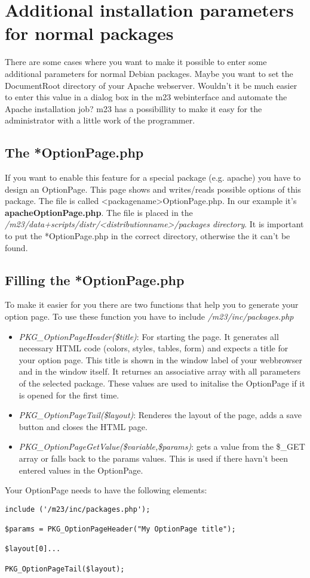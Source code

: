 \section{Additional installation parameters for normal packages}
There are some cases where you want to make it possible to enter some additional parameters for normal Debian packages. Maybe you want to set the DocumentRoot directory of your Apache webserver. Wouldn't it be much easier to enter this value in a dialog box in the m23 webinterface and automate the Apache installation job? m23 has a possibillity to make it easy for the administrator with a little work of the programmer.

\subsection{The *OptionPage.php}
If you want to enable this feature for a special package (e.g. apache) you have to design an OptionPage. This page shows and writes/reads possible options of this package. The file is called <packagename>OptionPage.php. In our example it's \textbf{apacheOptionPage.php}. The file is placed in the \\ \textit{/m23/data+scripts/distr/<distributionname>/packages directory}. It is important to put the *OptionPage.php in the correct directory, otherwise the it can't be found.

\subsection{Filling the *OptionPage.php}
To make it easier for you there are two functions that help you to generate your option page. To use these function you have to include \textit{/m23/inc/packages.php}
\begin{itemize}

\item \textit{PKG\_OptionPageHeader(\$title)}: For starting the page. It generates all necessary HTML code (colors, styles, tables, form) and expects a title for your option page. This title is shown in the window label of your webbrowser and in the window itself. It returnes an associative array with all parameters of the selected package. These values are used to initalise the OptionPage if it is opened for the first time.

\item \textit{PKG\_OptionPageTail(\$layout)}: Renderes the layout of the page, adds a save button and closes the HTML page.

\item \textit{PKG\_OptionPageGetValue(\$variable,\$params)}: gets a value from the \$\_GET array or falls back to the params values. This is used if there havn't been entered values in the OptionPage.
\end{itemize}
Your OptionPage needs to have the following elements:
\begin{verbatim}
include ('/m23/inc/packages.php');

$params = PKG_OptionPageHeader("My OptionPage title");

$layout[0]...

PKG_OptionPageTail($layout);
\end{verbatim}

